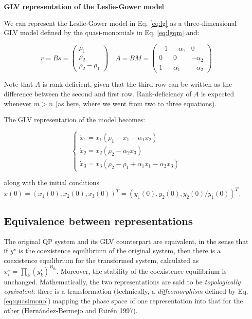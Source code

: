 \documentclass{article}
\begin{document}
\begin{cb}
\textbf{GLV representation of the Leslie-Gower model}

We can represent the Leslie-Gower model in Eq. \ref{eq:lg} as a three-dimensional GLV model defined by the quasi-monomials in Eq. \ref{eq:lgqm} and:

\begin{equation}
r = B s = \begin{pmatrix}
\rho_1\\
\rho_2\\
\rho_2 - \rho_1
\end{pmatrix}
\quad
A = B M = \begin{pmatrix}
-1 & -\alpha_1 & 0\\
0 & 0 & -\alpha_2\\
1 & \alpha_1 & -\alpha_2
\end{pmatrix}
\end{equation}

Note that $A$ is rank deficient, given that the third row can be written as the difference between the second and first row. Rank-deficiency of $A$ is expected whenever $m > n$ (as here, where we went from two to three equations).

The GLV representation of the model becomes:

\begin{equation}
\label{eq:lgglv}
\begin{cases}
\dot{x}_1 = x_1 (\rho_1 - x_1 - \alpha_1 x_2)\\
\dot{x}_2 = x_2 (\rho_2 - \alpha_2 x_3)\\
\dot{x}_3 = x_3 (\rho_2 - \rho_1 + \alpha_1 x_1 - \alpha_2 x_3)
\end{cases}
\end{equation}

along with the initial conditions $x(0) = (x_1(0), x_2(0), x_3(0))^T = (y_1(0), y_2(0), y_2(0) / y_1(0))^T$.

\end{cb}

\hypertarget{equivalence-between-representations}{%
\subsection{Equivalence between
representations}\label{equivalence-between-representations}}

The original QP system and its GLV counterpart are equivalent, in the
sense that if \(y^\star\) is the coexistence equilibrium of the original
system, then there is a coexistence equilibrium for the transformed
system, calculated as \(x_i^\star = \prod_{k} (y_k^\star)^{B_{ik}}\).
Moreover, the stability of the coexistence equilibrium is unchanged.
Mathematically, the two representations are said to be
\emph{topologically equivalent}: there is a transformation (technically,
a \emph{diffeomorphism} defined by Eq. \ref{eq:quasimono}) mapping the
phase space of one representation into that for the other
(Hernández-Bermejo and Fairén 1997).
\end{document}
